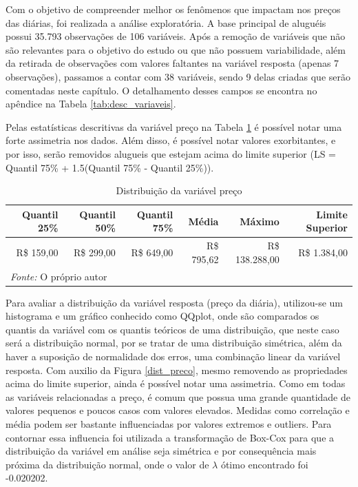 \documentclass[
	12pt,				%
	a4paper,		%
	oneside,    %
	chapter=TITLE,		   %
	section=TITLE,		   %
	subsection=TITLE,	   %
	subsubsection=TITLE, %
	english,			%
	french,				%
	spanish,			%
	brazil,				%
]{abntex2}
\begin{document}
Com o objetivo de compreender melhor os fenômenos que impactam nos
preços das diárias, foi realizada a análise exploratória. A base
principal de aluguéis possui 35.793 observações de 106 variáveis. Após a
remoção de variáveis que não são relevantes para o objetivo do estudo ou
que não possuem variabilidade, além da retirada de observações com
valores faltantes na variável resposta (apenas 7 observações), passamos
a contar com 38 variáveis, sendo 9 delas criadas que serão comentadas
neste capítulo. O detalhamento desses campos se encontra no apêndice na
Tabela \ref{tab:desc_variaveis}.

Pelas estatísticas descritivas da variável preço na Tabela
\ref{tab:preco_com_outlier} é possível notar uma forte assimetria nos
dados. Além disso, é possível notar valores exorbitantes, e por isso,
serão removidos alugueis que estejam acima do limite superior (LS =
Quantil 75\% + 1.5(Quantil 75\% - Quantil 25\%)).

\begin{table}

\caption{\label{tab:preco_com_outlier}Distribuição da variável preço}
\centering
\begin{tabular}[t]{r|r|r|r|r|r}
\hline
Quantil 25\% & Quantil 50\% & Quantil 75\% & Média & Máximo & Limite Superior\\
\hline
R\$     159,00 & R\$     299,00 & R\$     649,00 & R\$     795,62 & R\$ 138.288,00 & R\$   1.384,00\\
\hline
\multicolumn{6}{l}{\textit{Fonte: } O próprio autor}\\
\end{tabular}
\end{table}

Para avaliar a distribuição da variável resposta (preço da diária),
utilizou-se um histograma e um gráfico conhecido como QQplot, onde são
comparados os quantis da variável com os quantis teóricos de uma
distribuição, que neste caso será a distribuição normal, por se tratar
de uma distribuição simétrica, além da haver a suposição de normalidade
dos erros, uma combinação linear da variável resposta. Com auxilio da
Figura \ref{dist_preco}, mesmo removendo as propriedades acima do limite
superior, ainda é possível notar uma assimetria. Como em todas as
variáveis relacionadas a preço, é comum que possua uma grande quantidade
de valores pequenos e poucos casos com valores elevados. Medidas como
correlação e média podem ser bastante influenciadas por valores extremos
e outliers. Para contornar essa influencia foi utilizada a transformação
de Box-Cox para que a distribuição da variável em análise seja simétrica
e por consequência mais próxima da distribuição normal, onde o valor de
\(\lambda\) ótimo encontrado foi -0.020202.
\end{document}
